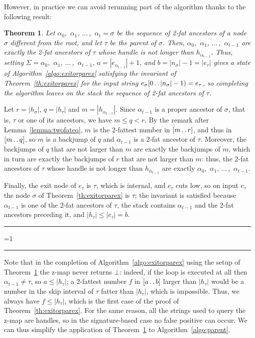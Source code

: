 \documentclass[a4paper]{article}
\newcounter{noqed}
\newcommand{\qed}{ \ifmmode\mbox{
}\fi\rule[-.05em]{.3em}{.7em}\setcounter{noqed}{0}}
\newenvironment{proof}[1][{}]{\noindent{\bf Proof#1.
}\setcounter{noqed}{1}}{\ifnum\value{noqed}=1\qed\fi\par\medskip}
\newtheorem{theorem}{Theorem}
\newcommand{\?}{\mskip1.5mu}
\newcommand{\lst}[2]{${#1}_0$,~${#1}_1$, $\dots\,$,~${#1}_{#2}$}
\def\..{\,\mathpunct{\ldotp\ldotp}} %
\begin{document}
However, in practice we can avoid rerunning part of the algorithm thanks to the following result:
\begin{theorem}
\label{th:parent}
Let $\alpha_0$,~$\alpha_1$, $\dots\,$,~${\alpha}_{t}=\sigma$
be the sequence of 2-fat ancestors of a node $\sigma$ different from the root, and let $\tau$ be the parent of $\sigma$. Then, 
$\alpha_0$,~$\alpha_1$, $\dots\,$,~${\alpha}_{t-1}$ are exactly the 2-fat ancestors of $\tau$ 
whose handle is not longer than $h_{\alpha_{t-1}}$. Thus, setting
$\Sigma=\alpha_0$,~$\alpha_1$, $\dots\,$,~${\alpha}_{t-1}$, $a = |e_{{\alpha}_{t-1}}|+1$, and $b=|n_\sigma|-1=|e_\tau|$
gives a state of Algorithm~\ref{algo:exitorparex} satisfying the invariant of Theorem~\ref{th:exitorparex}
for the input string $e_\sigma[0\..|n_\sigma|-1)=e_\tau$, so completing the algorithm leaves on the
stack the sequence of 2-fat ancestors of $\tau$.
\end{theorem}
\begin{proof}
Let $r=|h_\sigma|$, $q=|h_\tau|$ and $m=|h_{\alpha_{t-1}}|$. Since $\alpha_{t-1}$ is a proper ancestor of $\sigma$, that is,
$\tau$ or one of its ancestors, we have $m\leq q<r$. By the remark after Lemma~\ref{lemma:twofateq}, $m$ is the 
2-fattest number in $[m\..r]$, and thus in $[m\..q]$, so $m$ is a backjump of $q$ and $\alpha_{t-1}$ is a 2-fat ancestor of $\tau$.
Moreover, the backjumps of $q$ that are not larger than $m$ are exactly the backjumps of $m$, which in turn 
are exactly the backjumps of $r$ that are not larger than $m$: thus, the 2-fat ancestors of $\tau$ whose handle is not longer 
than $h_{\alpha_{t-1}}$ are exactly \lst\alpha{t-1}. 

Finally, the exit node of $e_\tau$ is $\tau$, which is internal, and $e_\tau$ cuts low, so on input $e_\tau$ the node $\sigma$ of 
Theorem~\ref{th:exitorparex} is $\tau$; the invariant is satisfied because $\alpha_{t-1}$ is one of the 2-fat ancestors of $\tau$,
the stack contains $\alpha_{t-1}$ and the 2-fat ancestors preceding it, and $|h_\tau|\leq|e_\tau|=b$. \qed
\end{proof}

Note that in the completion of Algorithm~\ref{algo:exitorparex} using the setup of Theorem~\ref{th:parent} 
the z-map never returns $\bot$: indeed, if the loop is executed at all then $\alpha_{t-1}\neq\tau$, so $a\leq|h_\tau|$; a 2-fattest number 
$f$ in $[a\..b]$ larger than $|h_\tau|$ would be a number in the skip interval of $\tau$ fatter than $|h_\tau|$, which is impossible. 
Thus, we always have $f\leq|h_\tau|$, 
which is the first case of the proof of Theorem~\ref{th:exitorparex}. For the same reason, all the strings used to query the z-map are 
handles, so in the signature-based case no false positive can occur. 
We can thus simplify the application of Theorem~\ref{th:parent} to Algorithm~\ref{algo:parent}. 
\end{document}
